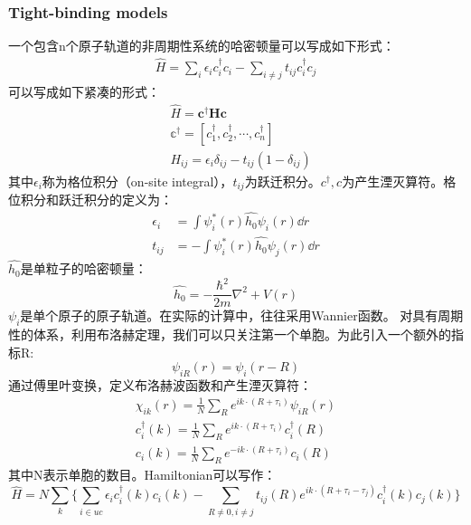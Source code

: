\subsubsection{Tight-binding models}
\qquad 一个包含n个原子轨道的非周期性系统的哈密顿量可以写成如下形式：
\begin{align}
    \hat{H}=\sum_{i}\epsilon_i c^{\dag}_{i}c_{i}-\sum_{i\neq j}t_{ij}c^{\dag}_{i}c_{j}
\end{align}
可以写成如下紧凑的形式：
\begin{equation}
    \begin{aligned}
        &\hat{H}=\mathbf{c^{\dag}Hc}\\
        &\mathbb{c^{\dag}}=[c^{\dag}_{1},c^{\dag}_{2},\cdots,c^{\dag}_{n}]\\
        &H_{ij}=\epsilon_i\delta_{ij}-t_{ij}(1-\delta_{ij})
    \end{aligned}
\end{equation}
其中$\epsilon_i$称为格位积分（on-site integral），$t_{ij}$为跃迁积分。$c^{\dag},c$为产生湮灭算符。格位积分和跃迁积分的定义为：
\begin{equation}
    \begin{aligned}
        \epsilon_i&=\int \psi^{*}_{i}(r)\hat{h_0}\psi_{i}(r)\dd{r}\\
        t_{ij}&=-\int \psi^{*}_{i}(r)\hat{h_0}\psi_{j}(r)\dd{r}
    \end{aligned}
\end{equation}
$\hat{h_0}$是单粒子的哈密顿量：
\begin{equation}
    \hat{h_0}=-\frac{\hbar^2}{2m}\nabla^2+V(r)
\end{equation}
$\psi_i$是单个原子的原子轨道。在实际的计算中，往往采用Wannier函数。
对具有周期性的体系，利用布洛赫定理，我们可以只关注第一个单胞。为此引入一个额外的指标R:
\begin{equation}
    \psi_{iR}(r)=\psi_i(r-R)
\end{equation}
通过傅里叶变换，定义布洛赫波函数和产生湮灭算符：
\begin{equation}
    \begin{aligned}
        \chi_{ik}(r)=\frac{1}{N}\sum_{R}e^{ik\cdot(R+\tau_i)}\psi_{iR}(r)\\
        c^{\dag}_i(k)=\frac{1}{N}\sum_{R}e^{ik\cdot(R+\tau_i)}c^{\dag}_i(R)\\
        c_i(k)=\frac{1}{N}\sum_{R}e^{-ik\cdot(R+\tau_i)}c_i(R)
    \end{aligned}
\end{equation}
其中N表示单胞的数目。Hamiltonian可以写作：
\begin{equation}
    \hat{H}=N\sum_{k}\{ \sum_{i\in uc}\epsilon_ic^{\dag}_{i}(k)c_i(k)-\sum_{R\neq 0,i\neq j}t_{ij}(R)e^{ik\cdot(R+\tau_i-\tau_j)}c^{\dag}_{i}(k)c_j(k)\}
\end{equation}
